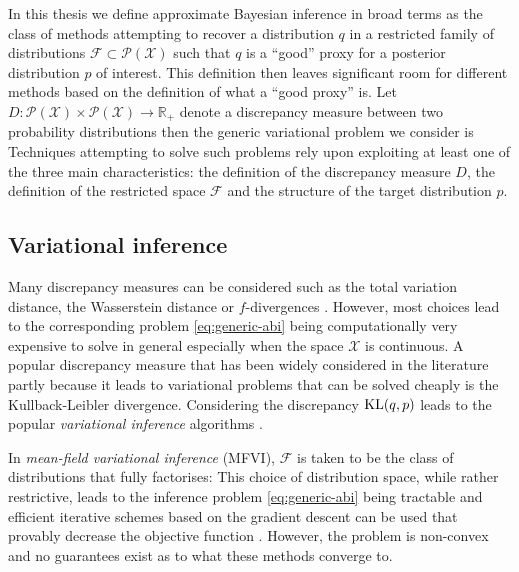 
In this thesis we define approximate Bayesian inference in broad terms as the class of methods attempting to recover a distribution $q$ in a restricted family of distributions $\mathcal F\subset \mathcal P(\mathcal X)$ such that $q$ is a ``good'' proxy for a posterior distribution $p$ of interest. 
This definition then leaves significant room for different methods based on the definition of what a ``good proxy'' is. Let $D:\mathcal P(\mathcal X)\times \mathcal P(\mathcal X)\to \mathbb R_{+}$ denote a discrepancy measure between two probability distributions then the generic variational problem we consider is
%
%
Techniques attempting to solve such problems rely upon exploiting at least one of the three main characteristics: the definition of the discrepancy measure $D$, the definition of the restricted space $\mathcal F$ and the structure of the target distribution $p$. 
\subsection{Variational inference}
Many discrepancy measures can be considered such as the total variation distance, the Wasserstein distance or $f$-divergences \citep{minka04, blei16, li16, bernton17}. However, most choices lead to the corresponding problem \eqref{eq:generic-abi} being computationally very expensive to solve in general especially when the space $\mathcal X$ is continuous.
A popular discrepancy measure that has been widely considered in the literature partly because it leads to variational problems that can be solved cheaply is the Kullback-Leibler divergence. Considering the discrepancy $\mathrm{KL}\!\left(q,p\right)$ leads to the popular \emph{variational inference} algorithms \citep{blei16}. 


In \emph{mean-field variational inference} (MFVI), $\mathcal F$ is taken to be the class of distributions that fully factorises:
%
% 
This choice of distribution space, while rather restrictive, leads to the inference problem \eqref{eq:generic-abi} being tractable and efficient iterative schemes based on the gradient descent can be used that provably decrease the objective function \citep{hoffman13, kucukelbir16, blei16}. However, the problem is non-convex and no guarantees exist as to what these methods converge to.

